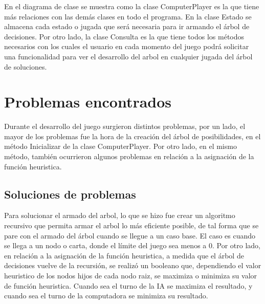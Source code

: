 \documentclass[12pt,a4paper]{article}
\begin{document}
En el diagrama de clase se muestra como la clase ComputerPlayer es la que tiene más relaciones con las demás clases en todo el programa. En la clase Estado se almacena cada estado o jugada que será necesaria para ir armando el árbol de decisiones.
Por otro lado, la clase Consulta es la que tiene todos los métodos necesarios con los cuales el usuario en cada momento del juego podrá solicitar una funcionalidad para ver el desarrollo del arbol en cualquier jugada del árbol de soluciones.
\newpage
\section{Problemas encontrados}
Durante el desarrollo del juego surgieron distintos problemas, por un lado, el mayor de los problemas fue la hora de la creación del árbol de posibilidades, en el método Inicializar de la clase ComputerPlayer. Por otro lado, en el mismo método, también ocurrieron algunos problemas en relación a la asignación de la función heuristica. 

\subsection{Soluciones de problemas}
Para solucionar el armado del arbol, lo que se hizo fue crear un algoritmo recursivo que permita armar el arbol lo más eficiente posible, de tal forma que se pare con el armado del árbol cuando se llegue a un caso base. El caso es cuando se llega a un nodo o carta, donde el límite del juego sea menos a 0.
Por otro lado, en relación a la asignación de la función heuristica, a medida que el árbol de decisiones vuelve de la recursión, se realizó un booleano que, dependiendo el valor heuristico de los nodos hijos de cada nodo raiz, se maximiza o minimiza su valor de función heuristica. Cuando sea el turno de la IA se maximiza el resultado, y cuando sea el turno de la computadora se minimiza su resultado.
\end{document}
